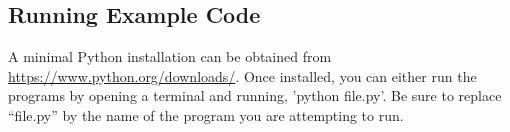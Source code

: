 \documentclass[12pt, oneside, a4paper]{book}
\begin{document}
   \appendix
   \begin{appendices}
   \chapter{Running Example Code}
   A minimal Python installation can be obtained from \url{https://www.python.org/downloads/}.
   Once installed, you can either run the programs by opening a terminal and running, 'python file.py'.
   Be sure to replace ``file.py'' by the name of the program you are attempting to run.
\newpage
{}
\printbibliography[title={Works Cited},heading=bibintoc]
   \end{appendices}
\end{document}
